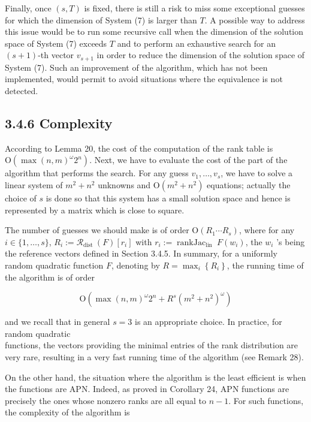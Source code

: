\documentclass[10pt]{article}
\begin{document}
Finally, once $(s, T)$ is fixed, there is still a risk to miss some exceptional guesses for which the dimension of System (7) is larger than $T$. A possible way to address this issue would be to run some recursive call when the dimension of the solution space of System (7) exceeds $T$ and to perform an exhaustive search for an $(s+1)$-th vector $v_{s+1}$ in order to reduce the dimension of the solution space of System (7). Such an improvement of the algorithm, which has not been implemented, would permit to avoid situations where the equivalence is not detected.

\subsection*{3.4.6 Complexity}
According to Lemma 20, the cost of the computation of the rank table is $\mathrm{O}\left(\max (n, m)^{\omega} 2^{n}\right)$. Next, we have to evaluate the cost of the part of the algorithm that performs the search. For any guess $v_{1}, \ldots, v_{s}$, we have to solve a linear system of $m^{2}+n^{2}$ unknowns and $\mathrm{O}\left(m^{2}+n^{2}\right)$ equations; actually the choice of $s$ is done so that this system has a small solution space and hence is represented by a matrix which is close to square.

The number of guesses we should make is of order $\mathrm{O}\left(R_{1} \cdots R_{s}\right)$, where for any $i \in\{1, \ldots, s\}$, $R_{i}:=\mathcal{R}_{\text {dist }}(F)\left[r_{i}\right]$ with $r_{i}:=\operatorname{rankJac}_{\text {lin }} F\left(w_{i}\right)$, the $w_{i}$ 's being the reference vectors defined in Section 3.4.5. In summary, for a uniformly random quadratic function $F$, denoting by $R=\max _{i}\left\{R_{i}\right\}$, the running time of the algorithm is of order

$$
\mathrm{O}\left(\max (n, m)^{\omega} 2^{n}+R^{s}\left(m^{2}+n^{2}\right)^{\omega}\right)
$$

and we recall that in general $s=3$ is an appropriate choice. In practice, for random quadratic\\
functions, the vectors providing the minimal entries of the rank distribution are very rare, resulting in a very fast running time of the algorithm (see Remark 28).

On the other hand, the situation where the algorithm is the least efficient is when the functions are APN. Indeed, as proved in Corollary 24, APN functions are precisely the ones whose nonzero ranks are all equal to $n-1$. For such functions, the complexity of the algorithm is
\end{document}
